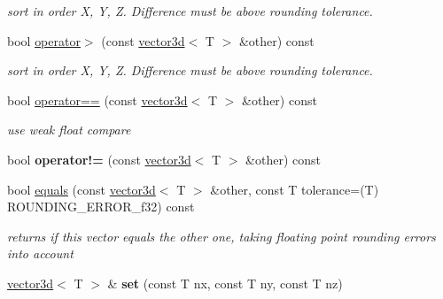 \begin{DoxyCompactItemize}
\begin{DoxyCompactList}\small\item\em sort in order X, Y, Z. Difference must be above rounding tolerance. \end{DoxyCompactList}\item 
bool \hyperlink{classirr_1_1core_1_1vector3d_aeabe64473259a894507360f399d7f816}{operator$>$} (const \hyperlink{classirr_1_1core_1_1vector3d}{vector3d}$<$ T $>$ \&other) const \hypertarget{classirr_1_1core_1_1vector3d_aeabe64473259a894507360f399d7f816}{}\label{classirr_1_1core_1_1vector3d_aeabe64473259a894507360f399d7f816}

\begin{DoxyCompactList}\small\item\em sort in order X, Y, Z. Difference must be above rounding tolerance. \end{DoxyCompactList}\item 
bool \hyperlink{classirr_1_1core_1_1vector3d_a3908b4e712fa753a0c88ca6dfce36e34}{operator==} (const \hyperlink{classirr_1_1core_1_1vector3d}{vector3d}$<$ T $>$ \&other) const \hypertarget{classirr_1_1core_1_1vector3d_a3908b4e712fa753a0c88ca6dfce36e34}{}\label{classirr_1_1core_1_1vector3d_a3908b4e712fa753a0c88ca6dfce36e34}

\begin{DoxyCompactList}\small\item\em use weak float compare \end{DoxyCompactList}\item 
bool {\bfseries operator!=} (const \hyperlink{classirr_1_1core_1_1vector3d}{vector3d}$<$ T $>$ \&other) const \hypertarget{classirr_1_1core_1_1vector3d_a125c9bfa0c551f3543f1466f1a670c51}{}\label{classirr_1_1core_1_1vector3d_a125c9bfa0c551f3543f1466f1a670c51}

\item 
bool \hyperlink{classirr_1_1core_1_1vector3d_a7aa9401191db377d67a6d5b160e4c38e}{equals} (const \hyperlink{classirr_1_1core_1_1vector3d}{vector3d}$<$ T $>$ \&other, const T tolerance=(T) R\+O\+U\+N\+D\+I\+N\+G\+\_\+\+E\+R\+R\+O\+R\+\_\+f32) const \hypertarget{classirr_1_1core_1_1vector3d_a7aa9401191db377d67a6d5b160e4c38e}{}\label{classirr_1_1core_1_1vector3d_a7aa9401191db377d67a6d5b160e4c38e}

\begin{DoxyCompactList}\small\item\em returns if this vector equals the other one, taking floating point rounding errors into account \end{DoxyCompactList}\item 
\hyperlink{classirr_1_1core_1_1vector3d}{vector3d}$<$ T $>$ \& {\bfseries set} (const T nx, const T ny, const T nz)\hypertarget{classirr_1_1core_1_1vector3d_a3e9048423e1176a7342759a290d55c96}{}\label{classirr_1_1core_1_1vector3d_a3e9048423e1176a7342759a290d55c96}


\end{DoxyCompactItemize}
